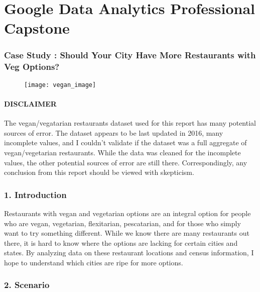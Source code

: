 \documentclass[
]{article}
\author{}
\date{\vspace{-2.5em}}
\begin{document}
\section{Google Data Analytics Professional
Capstone}\label{google-data-analytics-professional-capstone}

\subsubsection{Case Study : Should Your City Have More Restaurants with
Veg
Options?}\label{case-study-should-your-city-have-more-restaurants-with-veg-options}

\begin{figure}
\texttt{[image: vegan\_image]} \end{figure}

\paragraph{DISCLAIMER}\label{disclaimer}

The vegan/vegatarian restaurants dataset used for this report has many
potential sources of error. The dataset appears to be last updated in
2016, many incomplete values, and I couldn't validate if the dataset was
a full aggregate of vegan/vegetarian restaurants. While the data was
cleaned for the incomplete values, the other potential sources of error
are still there. Correspondingly, any conclusion from this report should
be viewed with skepticism.

\subsubsection{1. Introduction}\label{introduction}

Restaurants with vegan and vegetarian options are an integral option for
people who are vegan, vegetarian, flexitarian, pescatarian, and for
those who simply want to try something different. While we know there
are many restaurants out there, it is hard to know where the options are
lacking for certain cities and states. By analyzing data on these
restaurant locations and census information, I hope to understand which
cities are ripe for more options.

\subsubsection{2. Scenario}\label{scenario}
\end{document}
